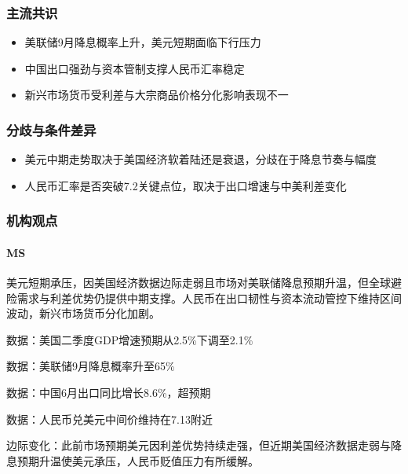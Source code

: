 \documentclass[11pt]{ctexart}
\begin{document}
\subsubsection*{主流共识}
\begin{itemize}
  \item 美联储9月降息概率上升，美元短期面临下行压力
  \item 中国出口强劲与资本管制支撑人民币汇率稳定
  \item 新兴市场货币受利差与大宗商品价格分化影响表现不一
\end{itemize}
\subsubsection*{分歧与条件差异}
\begin{itemize}
  \item 美元中期走势取决于美国经济软着陆还是衰退，分歧在于降息节奏与幅度
  \item 人民币汇率是否突破7.2关键点位，取决于出口增速与中美利差变化
\end{itemize}
\subsubsection*{机构观点}
\paragraph{MS} 美元短期承压，因美国经济数据边际走弱且市场对美联储降息预期升温，但全球避险需求与利差优势仍提供中期支撑。人民币在出口韧性与资本流动管控下维持区间波动，新兴市场货币分化加剧。
{\small\color{refgray}数据：美国二季度GDP增速预期从2.5\%下调至2.1\%\par}
{\small\color{refgray}数据：美联储9月降息概率升至65\%\par}
{\small\color{refgray}数据：中国6月出口同比增长8.6\%，超预期\par}
{\small\color{refgray}数据：人民币兑美元中间价维持在7.13附近\par}
{\small\color{refgray}边际变化：此前市场预期美元因利差优势持续走强，但近期美国经济数据走弱与降息预期升温使美元承压，人民币贬值压力有所缓解。\par}
\end{document}
